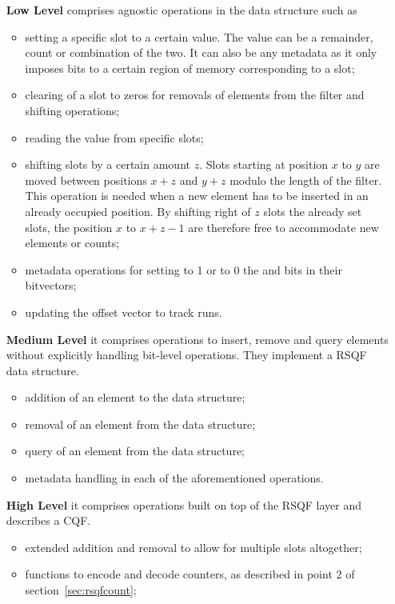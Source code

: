 \begin{itemize}[leftmargin=1.8cm]
	\item[\textbf{Low Level}] comprises agnostic operations in the data structure such as
	\begin{itemize}
		\item setting a specific slot to a certain value. The value can be a remainder, count or combination of the two. It can also be any metadata as it only imposes bits to a certain region of memory corresponding to a slot;
		\item clearing of a slot to zeros for removals of elements from the filter and shifting operations;
		\item reading the value from specific slots;
		\item shifting slots by a certain amount $z$. Slots starting at position $x$ to $y$ are moved between positions $x+z$ and $y+z$ modulo the length of the filter. This operation is needed when a new element has to be inserted in an already occupied position. By shifting right of $z$ slots the already set slots, the position $x$ to $x+z-1$ are therefore free to accommodate new elements or counts;
		\item metadata operations for setting to 1 or to 0 the \occs and \rends bits in their bitvectors;
		\item updating the offset vector to track runs.
	\end{itemize}
	\item[\textbf{Medium Level}] it comprises operations to insert, remove and query elements without explicitly handling bit-level operations. They implement a RSQF data structure.
	\begin{itemize}
		\item addition of an element to the data structure;
		\item removal of an element from the data structure;
		\item query of an element from the data structure;
		\item metadata handling in each of the aforementioned operations.
	\end{itemize}
	\item[\textbf{High Level}] it comprises operations built on top of the RSQF layer and describes a CQF.
	\begin{itemize}
		\item extended addition and removal to allow for multiple slots altogether;
		\item functions to encode and decode counters, as described in point 2 of section~\ref{sec:rsqfcount};

\end{itemize}
\end{itemize}
